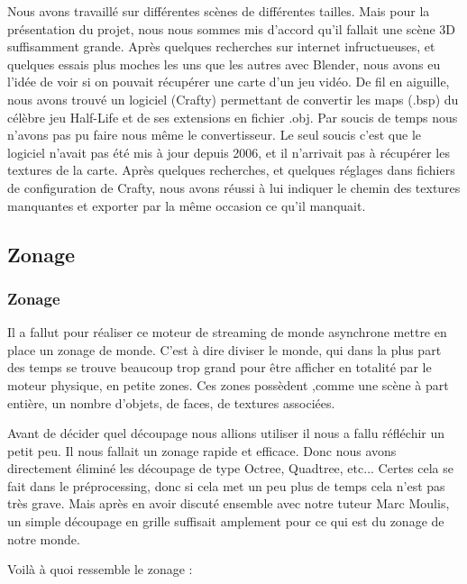\documentclass{report}
\begin{document}
Nous avons travaillé sur différentes scènes de différentes tailles. Mais pour la présentation du projet, nous nous sommes mis d'accord qu'il fallait une scène 3D suffisamment grande. Après quelques recherches sur internet infructueuses, et quelques essais plus moches les uns que les autres avec Blender, nous avons eu l'idée de voir si on pouvait récupérer une carte d'un jeu vidéo. De fil en aiguille, nous avons trouvé un logiciel (Crafty) permettant de convertir les maps (.bsp) du célèbre jeu Half-Life et de ses extensions en fichier .obj. Par soucis de temps nous n'avons pas pu faire nous même le convertisseur. Le seul soucis c'est que le logiciel n'avait pas été mis à jour depuis 2006, et il n'arrivait pas à récupérer les textures de la carte. Après quelques recherches, et quelques réglages dans fichiers de configuration de Crafty, nous avons réussi à lui indiquer le chemin des textures manquantes et exporter par la même occasion ce qu'il manquait. 
			\newpage	
			\subsection{Zonage}
			\subsubsection{Zonage}
			Il a fallut pour réaliser ce moteur de streaming de monde asynchrone mettre en place un zonage de monde. C'est à dire diviser le monde, qui dans la plus part des temps se trouve beaucoup trop grand pour être afficher en totalité par le moteur physique, en petite zones. Ces zones possèdent ,comme une scène à part entière, un nombre d'objets, de faces, de textures associées.
			
			Avant de décider quel découpage nous allions utiliser il nous a fallu réfléchir un petit peu. Il nous fallait un zonage rapide et efficace. Donc nous avons directement éliminé les découpage de type Octree, Quadtree, etc... Certes cela se fait dans le préprocessing, donc si cela met un peu plus de temps cela n'est pas très grave. Mais après en avoir discuté ensemble avec notre tuteur Marc Moulis, un simple découpage en grille suffisait amplement pour ce qui est du zonage de notre monde.
			
			Voilà à quoi ressemble le zonage : 
			
\end{document}
